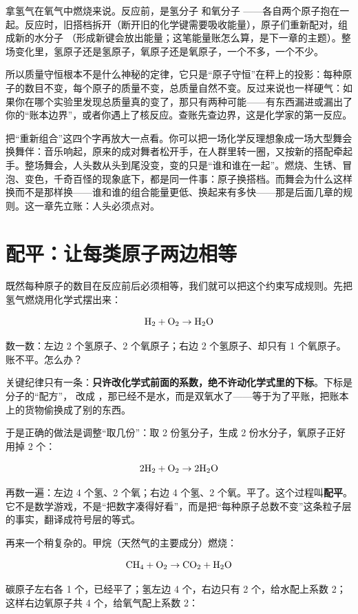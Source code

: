 拿氢气在氧气中燃烧来说。反应前，是氢分子  和氧分子 ——各自两个原子抱在一起。反应时，旧搭档拆开（断开旧的化学键需要吸收能量），原子们重新配对，组成新的水分子 （形成新键会放出能量；这笔能量账怎么算，是下一章的主题）。整场变化里，氢原子还是氢原子，氧原子还是氧原子，一个不多，一个不少。

所以质量守恒根本不是什么神秘的定律，它只是“原子守恒”在秤上的投影：每种原子的数目不变，每个原子的质量不变，总质量自然不变。反过来说也一样硬气：如果你在哪个实验里发现总质量真的变了，那只有两种可能——有东西漏进或漏出了你的“账本边界”，或者你遇上了核反应。查账先查边界，这是化学家的第一反应。

把“重新组合”这四个字再放大一点看。你可以把一场化学反理想象成一场大型舞会换舞伴：音乐响起，原来的成对舞者松开手，在人群里转一圈，又按新的搭配牵起手。整场舞会，人头数从头到尾没变，变的只是“谁和谁在一起”。燃烧、生锈、冒泡、变色，千奇百怪的现象底下，都是同一件事：原子换搭档。而舞会为什么这样换而不是那样换——谁和谁的组合能量更低、换起来有多快——那是后面几章的规则。这一章先立账：人头必须点对。

\section{配平：让每类原子两边相等}

既然每种原子的数目在反应前后必须相等，我们就可以把这个约束写成规则。先把氢气燃烧用化学式摆出来：

\[\mathrm{H_2} + \mathrm{O_2} \rightarrow \mathrm{H_2O}\]

数一数：左边 2 个氢原子、2 个氧原子；右边 2 个氢原子、却只有 1 个氧原子。账不平。怎么办？

关键纪律只有一条：\textbf{只许改化学式前面的系数，绝不许动化学式里的下标}。下标是分子的“配方”， 改成 ，那已经不是水，而是双氧水了——等于为了平账，把账本上的货物偷换成了别的东西。

于是正确的做法是调整“取几份”：取 2 份氢分子，生成 2 份水分子，氧原子正好用掉 2 个：

\[\mathrm{2H_2} + \mathrm{O_2} \rightarrow \mathrm{2H_2O}\]

再数一遍：左边 4 个氢、2 个氧；右边 4 个氢、2 个氧。平了。这个过程叫\textbf{配平}。它不是数学游戏，不是“把数字凑得好看”，而是把“每种原子总数不变”这条粒子层的事实，翻译成符号层的等式。

再来一个稍复杂的。甲烷（天然气的主要成分）燃烧：

\[\mathrm{CH_4} + \mathrm{O_2} \rightarrow \mathrm{CO_2} + \mathrm{H_2O}\]

碳原子左右各 1 个，已经平了；氢左边 4 个，右边只有 2 个，给水配上系数 2；这样右边氧原子共 4 个，给氧气配上系数 2：

